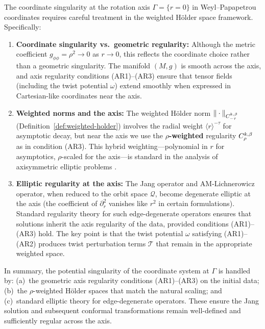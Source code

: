 \begin{remark}\label{rem:axis-weighted-holder}
The coordinate singularity at the rotation axis $\Gamma = \{r = 0\}$ in Weyl--Papapetrou coordinates requires careful treatment in the weighted H\"older space framework. Specifically:

\begin{enumerate}[label=\textup{(\roman*)}]
    \item \textbf{Coordinate singularity vs.~geometric regularity:} Although the metric coefficient $g_{\phi\phi} = \rho^2 \to 0$ as $r \to 0$, this reflects the coordinate choice rather than a geometric singularity. The manifold $(M, g)$ is smooth across the axis, and axis regularity conditions (AR1)--(AR3) ensure that tensor fields (including the twist potential $\omega$) extend smoothly when expressed in Cartesian-like coordinates near the axis.
    
    \item \textbf{Weighted norms and the axis:} The weighted H\"older norm $\|\cdot\|_{C^{k,\beta}_{-\tau}}$ (Definition~\ref{def:weighted-holder}) involves the radial weight $\langle r \rangle^{-\tau}$ for asymptotic decay, but near the axis we use the \textbf{$\rho$-weighted} regularity $C^{k,\beta}_\rho$ as in condition (AR3). This hybrid weighting---polynomial in $r$ for asymptotics, $\rho$-scaled for the axis---is standard in the analysis of axisymmetric elliptic problems \cite{chruscielwald1994, dainortiz2009}.
    
    \item \textbf{Elliptic regularity at the axis:} The Jang operator and AM-Lichnerowicz operator, when reduced to the orbit space $\mathcal{Q}$, become degenerate elliptic at the axis (the coefficient of $\partial_r^2$ vanishes like $r^2$ in certain formulations). Standard regularity theory \cite{mazzeo1991} for such edge-degenerate operators ensures that solutions inherit the axis regularity of the data, provided conditions (AR1)--(AR3) hold. The key point is that the twist potential $\omega$ satisfying (AR1)--(AR2) produces twist perturbation terms $\mathcal{T}$ that remain in the appropriate weighted space.
\end{enumerate}

In summary, the potential singularity of the coordinate system at $\Gamma$ is handled by: (a)~the geometric axis regularity conditions (AR1)--(AR3) on the initial data; (b)~the $\rho$-weighted H\"older spaces that match the natural scaling; and (c)~standard elliptic theory for edge-degenerate operators. These ensure the Jang solution and subsequent conformal transformations remain well-defined and sufficiently regular across the axis.
\end{remark}

